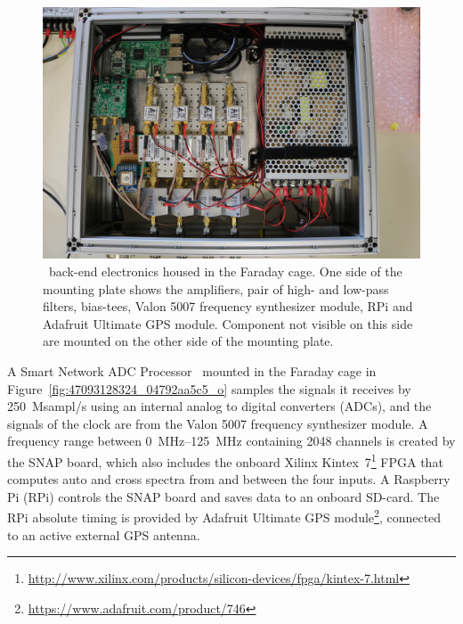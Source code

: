 \begin{figure}
	\centering
	\includegraphics[width=\linewidth]{Figures/47093126504_fa0061a85b_o}
	\caption{\albatros\ back-end electronics housed in the Faraday cage. One side of the mounting plate shows the amplifiers, pair of high- and low-pass filters, bias-tees, Valon 5007 frequency synthesizer module, RPi and Adafruit Ultimate GPS module. Component not visible on this side are mounted on the other side of the mounting plate.}
	\label{fig:47093126504_fa0061a85b_o}
\end{figure}

A Smart Network ADC Processor~\citep[SNAP;][]{2016JAI.....541001H} mounted in the Faraday cage in Figure~\ref{fig:47093128324_04792aa5c5_o} samples the signals it receives by \SI{250}{Msampl/s} using an internal analog to digital converters (ADCs), and the signals of the clock are from the Valon 5007 frequency synthesizer module. A frequency range between \SIrange{0}{125}{\mega\hertz} containing 2048 channels is created by the SNAP board, which also includes the onboard Xilinx Kintex~7\footnote{\url{http://www.xilinx.com/products/silicon-devices/fpga/kintex-7.html}} FPGA that computes auto and cross spectra from and between the four inputs. A Raspberry Pi (RPi) controls the SNAP board and saves data to an onboard SD-card. The RPi absolute timing is provided by Adafruit Ultimate GPS module\footnote{\url{https://www.adafruit.com/product/746}}, connected
to an active external GPS antenna.


